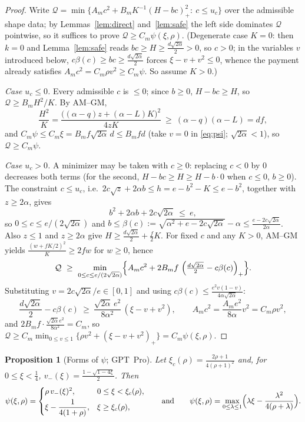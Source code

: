 \documentclass[11pt]{article}
\newtheorem{proposition}[theorem]{Proposition}
\newcommand{\pos}[1]{\left(#1\right)_{+}}
\newcommand{\cQ}{\mathcal Q}
\begin{document}
\begin{proof}
Write $\cQ=\min\{A_mc^2+B_mK^{-1}\pos{H-bc}^2:\ c\le u_c\}$ over the admissible
shape data; by Lemmas~\ref{lem:direct} and~\ref{lem:safe} the left side
dominates $\cQ$ pointwise, so it suffices to prove
$\cQ\ge C_m\psi(\xi,\rho)$.  (Degenerate case $K=0$: then $k=0$ and
Lemma~\ref{lem:safe} reads $bc\ge H\ge\frac{d\sqrt{2\alpha}}2>0$, so $c>0$;
in the variables $v$ introduced below, $c\beta(c)\ge bc\ge\frac{d\sqrt{2\alpha}}2$
forces $\xi-v+v^2\le0$, whence the payment already satisfies
$A_mc^2=C_m\rho v^2\ge C_m\psi$.  So assume $K>0$.)

\emph{Case $u_c\le0$.}  Every admissible $c$ is $\le0$; since $b\ge0$,
$H-bc\ge H$, so $\cQ\ge B_mH^2/K$.  By AM--GM,
\[
        \frac{H^2}{K}=\frac{\bigl((\alpha-q)z+(\alpha-L)K\bigr)^2}{4zK}
        \ \ge\ (\alpha-q)(\alpha-L)=df ,
\]
and $C_m\psi\le C_m\xi=B_mf\sqrt{2\alpha}\,d\le B_mfd$ (take $v=0$ in
\eqref{eq:psi}; $\sqrt{2\alpha}<1$), so $\cQ\ge C_m\psi$.

\emph{Case $u_c>0$.}  A minimizer may be taken with $c\ge0$: replacing $c<0$ by
$0$ decreases both terms (for the second, $H-bc\ge H\ge H-b\cdot0$ when $c\le0$,
$b\ge0$).  The constraint $c\le u_c$, i.e.\
$2c\sqrt z+2\alpha b\le h=e-b^2-K\le e-b^2$, together with $z\ge2\alpha$, gives
\begin{equation}\label{eq:bc-budget}
        b^2+2\alpha b+2c\sqrt{2\alpha}\ \le\ e ,
\end{equation}
so $0\le c\le e/(2\sqrt{2\alpha})$ and
$b\le\beta(c):=\sqrt{\alpha^2+e-2c\sqrt{2\alpha}}-\alpha
\le\frac{e-2c\sqrt{2\alpha}}{2\alpha}$.
Also $z\le1$ and $z\ge2\alpha$ give
$H\ge\frac{d\sqrt{2\alpha}}2+\frac f2K$.
For fixed $c$ and any $K>0$, AM--GM yields
$\frac{(w+fK/2)^2}{K}\ge2fw$ for $w\ge0$, hence
\[
        \cQ\ \ge\ \min_{0\le c\le e/(2\sqrt{2\alpha})}
        \Bigl\{A_mc^2+2B_mf\,\pos{\tfrac{d\sqrt{2\alpha}}2-c\beta(c)}\Bigr\}.
\]
Substituting $v=2c\sqrt{2\alpha}/e\in[0,1]$ and using
$c\beta(c)\le\frac{e^2v(1-v)}{4\alpha\sqrt{2\alpha}}$:
\[
        \frac{d\sqrt{2\alpha}}2-c\beta(c)
        \ \ge\ \frac{\sqrt{2\alpha}\,e^2}{8\alpha^2}\,(\xi-v+v^2),
        \qquad
        A_mc^2=\frac{A_me^2}{8\alpha}v^2=C_m\rho v^2 ,
\]
and $2B_mf\cdot\frac{\sqrt{2\alpha}e^2}{8\alpha^2}=C_m$, so
$\cQ\ge C_m\min_{0\le v\le1}\{\rho v^2+\pos{\xi-v+v^2}\}=C_m\psi(\xi,\rho)$.
\end{proof}

\begin{proposition}[Forms of $\psi$; GPT~Pro]\label{prop:psi-forms}
Let $\xi_c(\rho)=\frac{2\rho+1}{4(\rho+1)^2}$ and, for $0\le\xi<\frac14$,
$v_-(\xi)=\frac{1-\sqrt{1-4\xi}}2$.  Then
\[
        \psi(\xi,\rho)=
        \begin{cases}
        \rho\,v_-(\xi)^2,&0\le\xi<\xi_c(\rho),\\[1mm]
        \xi-\dfrac1{4(1+\rho)},&\xi\ge\xi_c(\rho),
        \end{cases}
        \qquad\text{and}\qquad
        \psi(\xi,\rho)=\max_{0\le\lambda\le1}
        \Bigl(\lambda\xi-\frac{\lambda^2}{4(\rho+\lambda)}\Bigr).
\]
\end{proposition}
\end{document}
